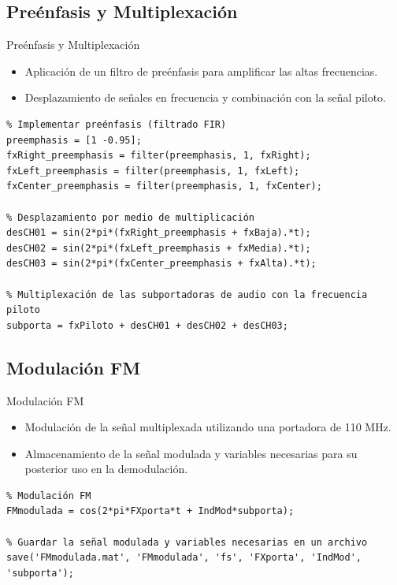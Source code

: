 \documentclass[mathserif,spanish]{beamer}
\begin{document}
\subsection{Preénfasis y Multiplexación}
\begin{frame}{Preénfasis y Multiplexación}
    \begin{itemize}
        \item Aplicación de un filtro de preénfasis para amplificar las altas frecuencias.
        \item Desplazamiento de señales en frecuencia y combinación con la señal piloto.
    \end{itemize}
    \begin{tcolorbox}[colback=yellow!5!white, colframe=yellow!75!black, title=Preénfasis y Multiplexación, fonttitle=\normalsize, fontupper=\normalsize]
\begin{lstlisting}
% Implementar preénfasis (filtrado FIR)
preemphasis = [1 -0.95];
fxRight_preemphasis = filter(preemphasis, 1, fxRight);
fxLeft_preemphasis = filter(preemphasis, 1, fxLeft);
fxCenter_preemphasis = filter(preemphasis, 1, fxCenter);

% Desplazamiento por medio de multiplicación 
desCH01 = sin(2*pi*(fxRight_preemphasis + fxBaja).*t);
desCH02 = sin(2*pi*(fxLeft_preemphasis + fxMedia).*t);
desCH03 = sin(2*pi*(fxCenter_preemphasis + fxAlta).*t);

% Multiplexación de las subportadoras de audio con la frecuencia piloto
subporta = fxPiloto + desCH01 + desCH02 + desCH03;
\end{lstlisting}
    \end{tcolorbox}
\end{frame}

\subsection{Modulación FM}
\begin{frame}{Modulación FM}
    \begin{itemize}
        \item Modulación de la señal multiplexada utilizando una portadora de 110 MHz.
        \item Almacenamiento de la señal modulada y variables necesarias para su posterior uso en la demodulación.
    \end{itemize}
    \begin{tcolorbox}[colback=yellow!5!white, colframe=yellow!75!black, title=Modulación FM, fonttitle=\normalsize, fontupper=\normalsize]
\begin{lstlisting}
% Modulación FM
FMmodulada = cos(2*pi*FXporta*t + IndMod*subporta);

% Guardar la señal modulada y variables necesarias en un archivo
save('FMmodulada.mat', 'FMmodulada', 'fs', 'FXporta', 'IndMod', 'subporta');
\end{lstlisting}
    \end{tcolorbox}
\end{frame}
\end{document}
